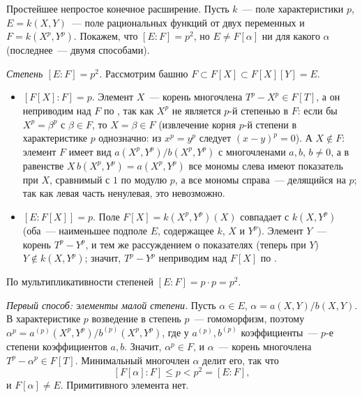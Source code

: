\begin{example}[5.5]
Простейшее непростое конечное расширение. Пусть $k$~--- поле характеристики $p$, $E=k(X,Y)$~--- поле рациональных
функций от двух переменных и $F=k(X^p,Y^p)$. Покажем, что $[E:F]=p^2$, но $E\ne F[\alpha]$ ни для какого $\alpha$
(последнее~--- двумя способами).

\emph{Степень $[E:F]=p^2$.} Рассмотрим башню $F\subset F[X]\subset F[X][Y]=E$.
\begin{itemize}[leftmargin=*]
\item $[F[X]:F]=p$. Элемент $X$~--- корень многочлена $T^p-X^p\in F[T]$, а он неприводим над $F$ по , так как
$X^p$ не является $p$-й степенью в $F$: если бы $X^p=\beta^p$ с $\beta\in F$, то $X=\beta\in F$ (извлечение
корня $p$-й степени в характеристике $p$ однозначно: из $x^p=y^p$ следует $(x-y)^p=0$). А $X\notin F$: элемент $F$ имеет вид $a(X^p,Y^p)/b(X^p,Y^p)$ с
многочленами $a,b$, $b\ne0$, а в равенстве $X\,b(X^p,Y^p)=a(X^p,Y^p)$ все мономы слева имеют показатель при $X$,
сравнимый с $1$ по модулю $p$, а все мономы справа~--- делящийся на $p$; так как левая часть ненулевая, это невозможно.
\item $[E:F[X]]=p$. Поле $F[X]=k(X^p,Y^p)(X)$ совпадает с $k(X,Y^p)$ (оба~--- наименьшее подполе $E$, содержащее $k$,
$X$ и $Y^p$). Элемент $Y$~--- корень $T^p-Y^p$, и тем же рассуждением о показателях (теперь при $Y$) $Y\notin k(X,Y^p)$;
значит, $T^p-Y^p$ неприводим над $F[X]$ по .
\end{itemize}
По мультипликативности степеней $[E:F]=p\cdot p=p^2$.

\emph{Первый способ: элементы малой степени.} Пусть $\alpha\in E$, $\alpha=a(X,Y)/b(X,Y)$. В характеристике $p$
возведение в степень $p$~--- гомоморфизм, поэтому $\alpha^p=a^{(p)}(X^p,Y^p)/b^{(p)}(X^p,Y^p)$, где у $a^{(p)},b^{(p)}$
коэффициенты~--- $p$-е степени коэффициентов $a,b$. Значит, $\alpha^p\in F$, и $\alpha$~--- корень многочлена
$T^p-\alpha^p\in F[T]$. Минимальный многочлен $\alpha$ делит его, так что
\[
[F[\alpha]:F]\le p<p^2=[E:F],
\]
и $F[\alpha]\ne E$. Примитивного элемента нет.


\end{example}
